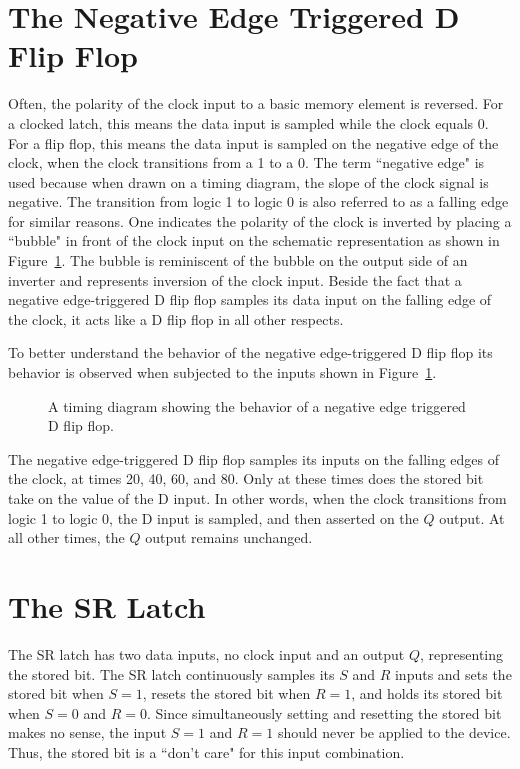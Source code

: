 \section{The Negative Edge Triggered D Flip Flop}
Often, the polarity of the clock input to a 
basic memory element is reversed.  For a clocked latch, this
means the data input is sampled while the clock equals 0.
For a flip flop, this means the data input is sampled on
the negative edge of the clock, when the clock transitions 
from a 1 to a 0. The term ``negative edge" is used because when
drawn on a timing diagram, the slope of the clock signal is
negative.  The transition from logic 1 to logic 0 is also referred 
to as a falling edge for similar reasons.
One indicates the polarity 
of the clock is inverted by placing a ``bubble" in front of 
the clock input on the schematic representation as shown
in Figure~\ref{fig:sequentialCirDFF}.  The bubble is reminiscent 
of the bubble on the output side of an inverter and 
represents inversion of the clock input. Beside the fact 
that a negative edge-triggered D flip flop samples its 
data input on the falling edge of the clock, it acts like 
a D flip flop in all other respects.

To better understand the behavior of the negative edge-triggered 
D flip flop its behavior is observed when subjected to the inputs 
shown in Figure~\ref{fig:sequentialCirDFF}.

\begin{figure}[ht]
\caption{A timing diagram showing the behavior of a 
negative edge triggered D flip flop.}
\label{fig:sequentialCirDFF}
\end{figure}

The negative edge-triggered D flip flop samples its inputs on the
falling edges of the clock, at times 20, 40, 60, and 80.  Only
at these times does the stored bit take on the value of the 
D input.  In other words, when the clock transitions from logic 1 to
logic 0, the D input is sampled, and then asserted on the $Q$ output.
At all other times, the $Q$ output remains unchanged.

\section{The SR Latch}
The SR latch has two data inputs, no clock input and an output $Q$, 
representing the stored bit. The SR latch continuously samples
its $S$ and $R$ inputs and sets the stored bit when $S=1$, resets the
stored bit when $R=1$, and holds its stored bit when $S=0$ and $R=0$.
Since simultaneously setting and resetting the
stored bit makes no sense, the input $S=1$ and $R=1$ should never be applied to
the device.  Thus, the stored bit is a ``don't care" for this input
combination.


